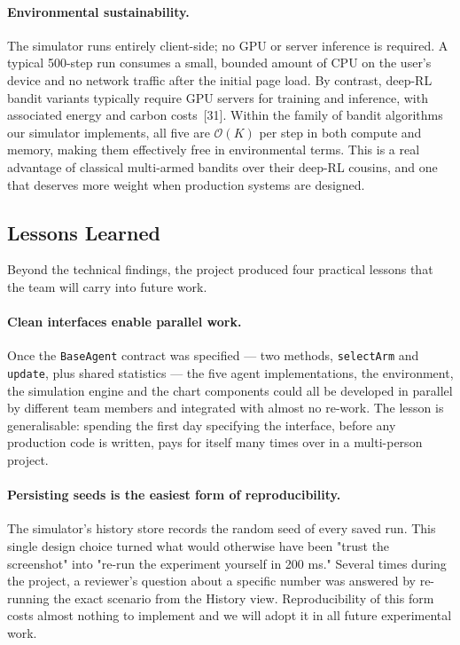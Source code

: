 \paragraph{Environmental sustainability.}
The simulator runs entirely client-side; no GPU or server inference is required. A typical 500-step run consumes a small, bounded amount of CPU on the user's device and no network traffic after the initial page load. By contrast, deep-RL bandit variants typically require GPU servers for training and inference, with associated energy and carbon costs~[31]. Within the family of bandit algorithms our simulator implements, all five are $\mathcal{O}(K)$ per step in both compute and memory, making them effectively free in environmental terms. This is a real advantage of classical multi-armed bandits over their deep-RL cousins, and one that deserves more weight when production systems are designed.

\subsection{Lessons Learned}
Beyond the technical findings, the project produced four practical lessons that the team will carry into future work.

\paragraph{Clean interfaces enable parallel work.}
Once the \texttt{BaseAgent} contract was specified --- two methods, \texttt{selectArm} and \texttt{update}, plus shared statistics --- the five agent implementations, the environment, the simulation engine and the chart components could all be developed in parallel by different team members and integrated with almost no re-work. The lesson is generalisable: spending the first day specifying the interface, before any production code is written, pays for itself many times over in a multi-person project.

\paragraph{Persisting seeds is the easiest form of reproducibility.}
The simulator's history store records the random seed of every saved run. This single design choice turned what would otherwise have been "trust the screenshot" into "re-run the experiment yourself in 200 ms." Several times during the project, a reviewer's question about a specific number was answered by re-running the exact scenario from the History view. Reproducibility of this form costs almost nothing to implement and we will adopt it in all future experimental work.

